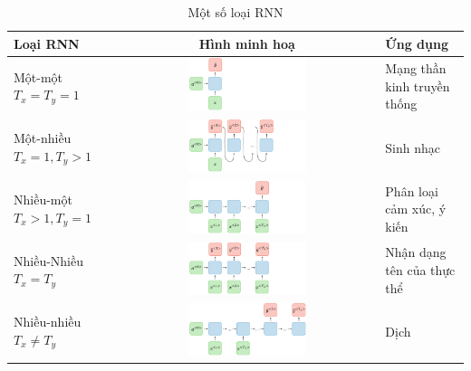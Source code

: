\begin{table}[htb!]
    \centering
    \caption{Một số loại RNN \cite{webpage6}}
    \begin{tabularx}{\textwidth}{ L{1} c L{1} }
        \toprule
        \textbf{Loại RNN}         & \textbf{Hình minh hoạ}                                                                     & \textbf{Ứng dụng}           \\\midrule
        Một-một $T_x=T_y=1$       & \includegraphics[width=0.47\textwidth, valign=c]{image/rnn-one-to-one-ltr.png}             & Mạng thần kinh truyền thống \\\midrule
        Một-nhiều $T_x=1,T_y>1$   & \includegraphics[width=0.47\textwidth, valign=c]{image/rnn-one-to-many-ltr.png}            & Sinh nhạc                   \\\midrule
        Nhiều-một $T_x>1,T_y=1$   & \includegraphics[width=0.47\textwidth, valign=c]{image/rnn-many-to-one-ltr.png}            & Phân loại cảm xúc, ý kiến   \\\midrule
        Nhiều-Nhiều $T_x=T_y$     & \includegraphics[width=0.47\textwidth, valign=c]{image/rnn-many-to-many-same-ltr.png}      & Nhận dạng tên của thực thể  \\\midrule
        Nhiều-nhiều $T_x\neq T_y$ & \includegraphics[width=0.47\textwidth, valign=c]{image/rnn-many-to-many-different-ltr.png} & Dịch                        \\
        \bottomrule
    \end{tabularx}
\end{table}

